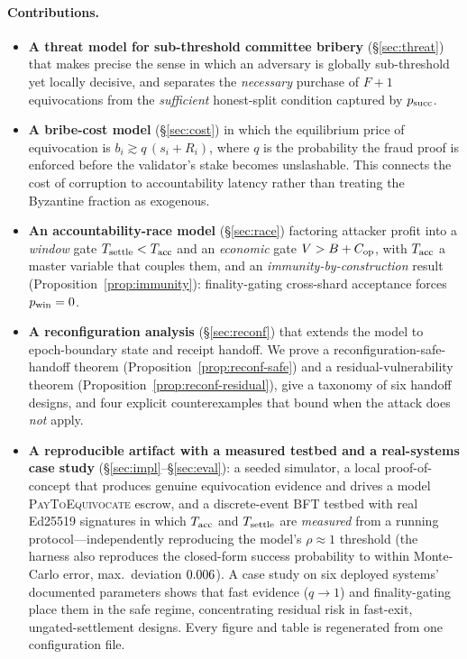 \paragraph{Contributions.}
\begin{itemize}
  \item \textbf{A threat model for sub-threshold committee bribery} (\S\ref{sec:threat}) that
  makes precise the sense in which an adversary is globally sub-threshold yet locally decisive,
  and separates the \emph{necessary} purchase of $F+1$ equivocations from the \emph{sufficient}
  honest-split condition captured by $p_{\mathrm{succ}}$.
  \item \textbf{A bribe-cost model} (\S\ref{sec:cost}) in which the equilibrium price of
  equivocation is $b_i \gtrsim q\,(s_i + R_i)$, where $q$ is the probability the fraud proof is
  enforced before the validator's stake becomes unslashable. This connects the cost of corruption
  to accountability latency rather than treating the Byzantine fraction as exogenous.
  \item \textbf{An accountability-race model} (\S\ref{sec:race}) factoring attacker profit into a
  \emph{window} gate $T_{\mathrm{settle}}<T_{\mathrm{acc}}$ and an \emph{economic} gate $V > B + C_{\mathrm{op}}$, with $T_{\mathrm{acc}}$ a
  master variable that couples them, and an \emph{immunity-by-construction} result
  (Proposition~\ref{prop:immunity}): finality-gating cross-shard acceptance forces $p_{\mathrm{win}}=0$.
  \item \textbf{A reconfiguration analysis} (\S\ref{sec:reconf}) that extends the model to
  epoch-boundary state and receipt handoff. We prove a reconfiguration-safe-handoff theorem
  (Proposition~\ref{prop:reconf-safe}) and a residual-vulnerability theorem
  (Proposition~\ref{prop:reconf-residual}), give a taxonomy of six handoff designs, and four
  explicit counterexamples that bound when the attack does \emph{not} apply.
  \item \textbf{A reproducible artifact with a measured testbed and a real-systems case study}
  (\S\ref{sec:impl}--\S\ref{sec:eval}): a seeded simulator, a local proof-of-concept that produces
  genuine equivocation evidence and drives a model \textsc{PayToEquivocate} escrow, and a
  discrete-event BFT testbed with real Ed25519 signatures in which $T_{\mathrm{acc}}$ and $T_{\mathrm{settle}}$ are
  \emph{measured} from a running protocol---independently reproducing the model's $\rho\approx1$
  threshold (the harness also reproduces the closed-form success probability to within Monte-Carlo
  error, max.\ deviation $0.006$). A case study on six deployed systems' documented
  parameters shows that fast evidence ($q\to1$) and finality-gating place them in the safe regime,
  concentrating residual risk in fast-exit, ungated-settlement designs. Every figure and table is
  regenerated from one configuration file.
\end{itemize}

